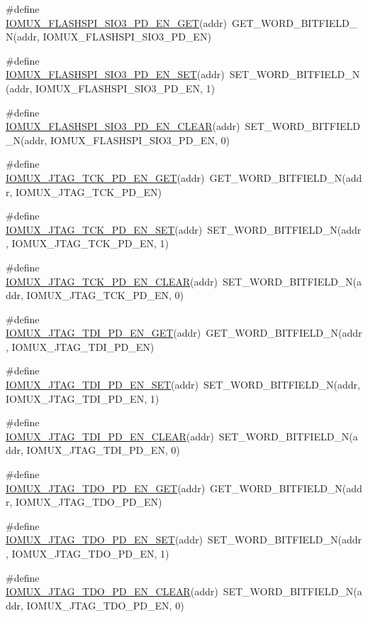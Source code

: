 \begin{DoxyCompactItemize}
\#define \hyperlink{a00559_a34883fde49db69ac2e64e125e615f73f}{IOMUX\_\-FLASHSPI\_\-SIO3\_\-PD\_\-EN\_\-GET}(addr)~GET\_\-WORD\_\-BITFIELD\_\-N(addr, IOMUX\_\-FLASHSPI\_\-SIO3\_\-PD\_\-EN)
\item 
\#define \hyperlink{a00559_a756b84ab5795c876290a618b8e721fb9}{IOMUX\_\-FLASHSPI\_\-SIO3\_\-PD\_\-EN\_\-SET}(addr)~SET\_\-WORD\_\-BITFIELD\_\-N(addr, IOMUX\_\-FLASHSPI\_\-SIO3\_\-PD\_\-EN, 1)
\item 
\#define \hyperlink{a00559_a8de84d31da3bbd161d3c005d9df643ae}{IOMUX\_\-FLASHSPI\_\-SIO3\_\-PD\_\-EN\_\-CLEAR}(addr)~SET\_\-WORD\_\-BITFIELD\_\-N(addr, IOMUX\_\-FLASHSPI\_\-SIO3\_\-PD\_\-EN, 0)
\item 
\#define \hyperlink{a00559_a96bccb863c4398cd796c59e4566649fb}{IOMUX\_\-JTAG\_\-TCK\_\-PD\_\-EN\_\-GET}(addr)~GET\_\-WORD\_\-BITFIELD\_\-N(addr, IOMUX\_\-JTAG\_\-TCK\_\-PD\_\-EN)
\item 
\#define \hyperlink{a00559_a29c6ff21d573b1c1d1c89e2eecc0a728}{IOMUX\_\-JTAG\_\-TCK\_\-PD\_\-EN\_\-SET}(addr)~SET\_\-WORD\_\-BITFIELD\_\-N(addr, IOMUX\_\-JTAG\_\-TCK\_\-PD\_\-EN, 1)
\item 
\#define \hyperlink{a00559_a4ad4fbeb8dc9bf6354ee1c513ae62bac}{IOMUX\_\-JTAG\_\-TCK\_\-PD\_\-EN\_\-CLEAR}(addr)~SET\_\-WORD\_\-BITFIELD\_\-N(addr, IOMUX\_\-JTAG\_\-TCK\_\-PD\_\-EN, 0)
\item 
\#define \hyperlink{a00559_a8c114c47c19557a657b1b72687840e9d}{IOMUX\_\-JTAG\_\-TDI\_\-PD\_\-EN\_\-GET}(addr)~GET\_\-WORD\_\-BITFIELD\_\-N(addr, IOMUX\_\-JTAG\_\-TDI\_\-PD\_\-EN)
\item 
\#define \hyperlink{a00559_ae28541ca1604cae226d0839cf7141f0d}{IOMUX\_\-JTAG\_\-TDI\_\-PD\_\-EN\_\-SET}(addr)~SET\_\-WORD\_\-BITFIELD\_\-N(addr, IOMUX\_\-JTAG\_\-TDI\_\-PD\_\-EN, 1)
\item 
\#define \hyperlink{a00559_ae7b72cb14b2c6f083495dfafa03a721b}{IOMUX\_\-JTAG\_\-TDI\_\-PD\_\-EN\_\-CLEAR}(addr)~SET\_\-WORD\_\-BITFIELD\_\-N(addr, IOMUX\_\-JTAG\_\-TDI\_\-PD\_\-EN, 0)
\item 
\#define \hyperlink{a00559_aa38ce00f2a51015a27c28ea0c4e8a0e7}{IOMUX\_\-JTAG\_\-TDO\_\-PD\_\-EN\_\-GET}(addr)~GET\_\-WORD\_\-BITFIELD\_\-N(addr, IOMUX\_\-JTAG\_\-TDO\_\-PD\_\-EN)
\item 
\#define \hyperlink{a00559_a98768d89243a62872687c739a2679c22}{IOMUX\_\-JTAG\_\-TDO\_\-PD\_\-EN\_\-SET}(addr)~SET\_\-WORD\_\-BITFIELD\_\-N(addr, IOMUX\_\-JTAG\_\-TDO\_\-PD\_\-EN, 1)
\item 
\#define \hyperlink{a00559_a8960679f7beefcd5a0c27365a7a519fd}{IOMUX\_\-JTAG\_\-TDO\_\-PD\_\-EN\_\-CLEAR}(addr)~SET\_\-WORD\_\-BITFIELD\_\-N(addr, IOMUX\_\-JTAG\_\-TDO\_\-PD\_\-EN, 0)

\end{DoxyCompactItemize}
